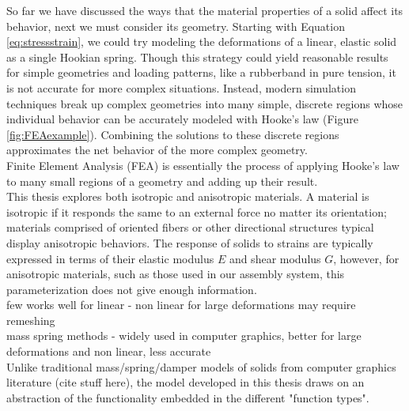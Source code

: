 {So far we have discussed the ways that the material properties of a solid affect its behavior, next we must consider its geometry.  Starting with Equation \ref{eq:stressstrain}, we could try modeling the deformations of a linear, elastic solid as a single Hookian spring.  Though this strategy could yield reasonable results for simple geometries and loading patterns, like a rubberband in pure tension, it is not accurate for more complex situations.  Instead, modern simulation techniques break up complex geometries into many simple, discrete regions whose individual behavior can be accurately modeled with Hooke's law (Figure \ref{fig:FEAexample}).  Combining the solutions to these discrete regions approximates the net behavior of the more complex geometry.\\

Finite Element Analysis (FEA) is essentially the process of applying Hooke's law to many small regions of a geometry and adding up their result.\\


This thesis explores both isotropic and anisotropic materials.  A material is isotropic if it responds the same to an external force no matter its orientation; materials comprised of oriented fibers or other directional structures typical display anisotropic behaviors.  The response of solids to strains are typically expressed in terms of their elastic modulus $E$ and shear modulus $G$, however, for anisotropic materials, such as those used in our assembly system, this parameterization does not give enough information.\\









few works well for linear - non linear for large deformations may require remeshing\\
mass spring methods - widely used in computer graphics, better for large deformations and non linear, less accurate\\

Unlike traditional mass/spring/damper models of solids from computer graphics literature (cite stuff here), the model developed in this thesis draws on an abstraction of the functionality embedded in the different "function types".\\

}

